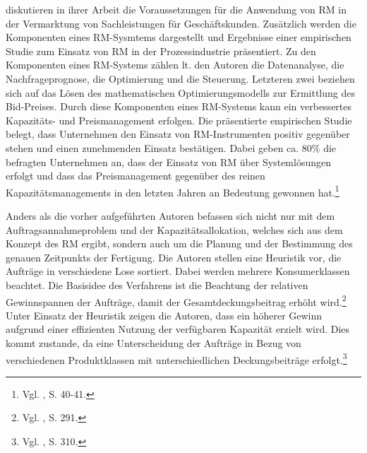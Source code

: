 \cite{kolisch2006revenue} diskutieren in ihrer Arbeit die Voraussetzungen für die Anwendung von RM in der Vermarktung von Sachleistungen für Geschäftskunden. Zusätzlich werden die Komponenten eines RM-Sysmtems dargestellt und Ergebnisse einer empirischen Studie zum Einsatz von RM in der Prozessindustrie präsentiert. Zu den Komponenten eines RM-Systems zählen lt. den Autoren die Datenanalyse, die Nachfrageprognose, die Optimierung und die Steuerung. Letzteren zwei beziehen sich auf das Lösen des mathematischen Optimierungsmodells zur Ermittlung des Bid-Preises. Durch diese Komponenten eines RM-Systems kann ein verbessertes Kapazitäts- und Preismanagement erfolgen. Die präsentierte empirischen Studie belegt, dass Unternehmen den Einsatz von RM-Instrumenten positiv gegenüber stehen und einen zunehmenden Einsatz bestätigen. Dabei geben ca. 80\% die befragten Unternehmen an, dass der Einsatz von RM über Systemlösungen erfolgt und dass das Preismanagement gegenüber des reinen Kapazitätsmanagements in den letzten Jahren an Bedeutung gewonnen hat.\footnote{Vgl. \cite{kolisch2006revenue}, S. 40-41.}

Anders als die vorher aufgeführten Autoren befassen sich \cite{DECI:DECI074} nicht nur mit dem Auftragsannahmeproblem und der Kapazitätsallokation, welches sich aus dem Konzept des RM ergibt, sondern auch um die Planung und der Bestimmung des genauen Zeitpunkts der Fertigung. Die Autoren stellen eine Heuristik vor, die Aufträge in verschiedene Lose sortiert. Dabei werden mehrere Konsumerklassen beachtet. Die Basisidee des Verfahrens ist die Beachtung der relativen Gewinnspannen der Aufträge, damit der Gesamtdeckungsbeitrag erhöht wird.\footnote{Vgl. \cite{DECI:DECI074}, S. 291.} Unter Einsatz der Heuristik zeigen die Autoren, dass ein höherer Gewinn aufgrund einer effizienten Nutzung der verfügbaren Kapazität erzielt wird. Dies kommt zustande, da eine Unterscheidung der Aufträge in Bezug von verschiedenen Produktklassen mit unterschiedlichen Deckungsbeiträge erfolgt.\footnote{Vgl. \cite{DECI:DECI074}, S. 310.}

